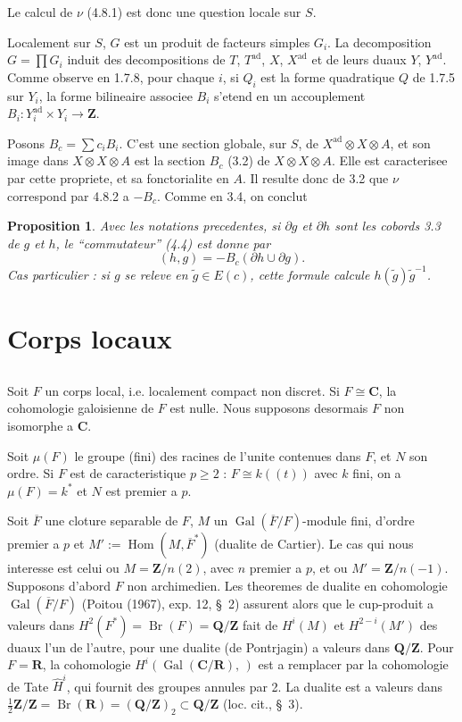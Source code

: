 \documentclass[11pt,a4paper]{article}
\theoremstyle{plain}
\newtheorem{proposition}[theorem]{Proposition}
\theoremstyle{definition}
\DeclareMathOperator{\Gal}{Gal}
\DeclareMathOperator{\Hom}{Hom}
\DeclareMathOperator{\ad}{ad}
\DeclareMathOperator{\Br}{Br}
\begin{document}
Le calcul de $\nu$ (4.8.1) est donc une question locale sur $S$.

Localement sur $S$, $G$ est un produit de facteurs simples $G_i$. La decomposition $G = \prod G_i$ induit des decompositions de $T$, $T^{\ad}$, $X$, $X^{\ad}$ et de leurs duaux $Y$, $Y^{\ad}$. Comme observe en 1.7.8, pour chaque $i$, si $Q_i$ est la forme quadratique $Q$ de 1.7.5 sur $Y_i$, la forme bilineaire associee $B_i$ s'etend en un accouplement $B_i : Y_i^{\ad} \times Y_i \to \mathbf{Z}$.

Posons $B_c = \sum c_i B_i$. C'est une section globale, sur $S$, de $X^{\ad} \otimes X \otimes A$, et son image dans $X \otimes X \otimes A$ est la section $B_c$ (3.2) de $X \otimes X \otimes A$. Elle est caracterisee par cette propriete, et sa fonctorialite en $A$. Il resulte donc de 3.2 que $\nu$ correspond par 4.8.2 a $-B_c$. Comme en 3.4, on conclut

\begin{proposition}\label{4.9}
Avec les notations precedentes, si $\partial g$ et $\partial h$ sont les cobords 3.3 de $g$ et $h$, le ``commutateur'' (4.4) est donne par
\[
(h, g) = -B_c(\partial h \cup \partial g).
\]
Cas particulier : si $g$ se releve en $\tilde{g} \in E(c)$, cette formule calcule $h(\tilde{g}) \tilde{g}^{-1}$.
\end{proposition}

\section{Corps locaux}

\subsection{}\label{5.1}

Soit $F$ un corps local, i.e. localement compact non discret. Si $F \cong \mathbf{C}$, la cohomologie galoisienne de $F$ est nulle. Nous supposons desormais $F$ non isomorphe a $\mathbf{C}$.

Soit $\mu(F)$ le groupe (fini) des racines de l'unite contenues dans $F$, et $N$ son ordre. Si $F$ est de caracteristique $p \geq 2$ : $F \cong k((t))$ avec $k$ fini, on a $\mu(F) = k^*$ et $N$ est premier a $p$.

Soit $\overline{F}$ une cloture separable de $F$, $M$ un $\Gal(\overline{F}/F)$-module fini, d'ordre premier a $p$ et $M' := \Hom(M, \overline{F}^*)$ (dualite de Cartier). Le cas qui nous interesse est celui ou $M = \mathbf{Z}/n(2)$, avec $n$ premier a $p$, et ou $M' = \mathbf{Z}/n(-1)$. Supposons d'abord $F$ non archimedien. Les theoremes de dualite en cohomologie $\Gal(\overline{F}/F)$ (Poitou (1967), exp. 12, \S~2) assurent alors que le cup-produit a valeurs dans $H^2(F^*) = \Br(F) = \mathbf{Q}/\mathbf{Z}$ fait de $H^i(M)$ et $H^{2-i}(M')$ des duaux l'un de l'autre, pour une dualite (de Pontrjagin) a valeurs dans $\mathbf{Q}/\mathbf{Z}$. Pour $F = \mathbf{R}$, la cohomologie $H^i(\Gal(\mathbf{C}/\mathbf{R}), \,)$ est a remplacer par la cohomologie de Tate $\widehat{H}^i$, qui fournit des groupes annules par 2. La dualite est a valeurs dans $\frac{1}{2}\mathbf{Z}/\mathbf{Z} = \Br(\mathbf{R}) = (\mathbf{Q}/\mathbf{Z})_2 \subset \mathbf{Q}/\mathbf{Z}$ (loc. cit., \S~3).
\end{document}
